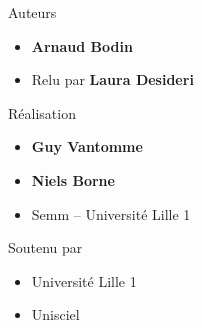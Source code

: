 \begin{frame}
\begin{minipage}{0.90\textwidth}
   
  Auteurs
  \begin{itemize}
  \item {\bf Arnaud Bodin}

  \item Relu par {\bf Laura Desideri}

  \end{itemize}

  \smallskip

  Réalisation
  \begin{itemize}
    \item {\bf Guy Vantomme}
    \item {\bf Niels Borne} 
    \item Semm -- Université Lille 1
  \end{itemize}

  \smallskip

  Soutenu par 
  \begin{itemize}
    \item Université Lille 1
    \item Unisciel
  \end{itemize}

  \end{minipage}  



\end{frame}


